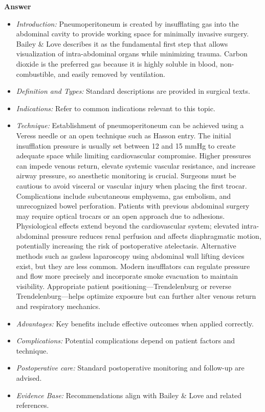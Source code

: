 \documentclass{article}
\begin{document}
\textbf{Answer}
\begin{itemize}

\item \emph{Introduction:} Pneumoperitoneum is created by insufflating gas into the abdominal cavity to provide working space for minimally invasive surgery. Bailey \& Love describes it as the fundamental first step that allows visualization of intra-abdominal organs while minimizing trauma. Carbon dioxide is the preferred gas because it is highly soluble in blood, non-combustible, and easily removed by ventilation.
\item \emph{Definition and Types:} Standard descriptions are provided in surgical texts.
\item \emph{Indications:} Refer to common indications relevant to this topic.

\item \emph{Technique:} Establishment of pneumoperitoneum can be achieved using a Veress needle or an open technique such as Hasson entry. The initial insufflation pressure is usually set between 12 and 15 mmHg to create adequate space while limiting cardiovascular compromise. Higher pressures can impede venous return, elevate systemic vascular resistance, and increase airway pressure, so anesthetic monitoring is crucial. Surgeons must be cautious to avoid visceral or vascular injury when placing the first trocar. Complications include subcutaneous emphysema, gas embolism, and unrecognized bowel perforation. Patients with previous abdominal surgery may require optical trocars or an open approach due to adhesions. Physiological effects extend beyond the cardiovascular system; elevated intra-abdominal pressure reduces renal perfusion and affects diaphragmatic motion, potentially increasing the risk of postoperative atelectasis. Alternative methods such as gasless laparoscopy using abdominal wall lifting devices exist, but they are less common. Modern insufflators can regulate pressure and flow more precisely and incorporate smoke evacuation to maintain visibility. Appropriate patient positioning—Trendelenburg or reverse Trendelenburg—helps optimize exposure but can further alter venous return and respiratory mechanics.
\item \emph{Advantages:} Key benefits include effective outcomes when applied correctly.
\item \emph{Complications:} Potential complications depend on patient factors and technique.
\item \emph{Postoperative care:} Standard postoperative monitoring and follow-up are advised.
\item \emph{Evidence Base:} Recommendations align with Bailey \& Love and related references.


\end{itemize}
\end{document}
